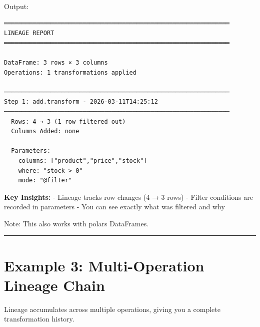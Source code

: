 \documentclass[
  letterpaper,
]{scrbook}
\begin{document}
Output:

\begin{verbatim}
═══════════════════════════════════════════════════════════════
LINEAGE REPORT
═══════════════════════════════════════════════════════════════

DataFrame: 3 rows × 3 columns
Operations: 1 transformations applied

───────────────────────────────────────────────────────────────
Step 1: add.transform - 2026-03-11T14:25:12
───────────────────────────────────────────────────────────────
  Rows: 4 → 3 (1 row filtered out)
  Columns Added: none
  
  Parameters:
    columns: ["product","price","stock"]
    where: "stock > 0"
    mode: "@filter"
\end{verbatim}

\textbf{Key Insights:} - Lineage tracks row changes (4 → 3 rows) -
Filter conditions are recorded in parameters - You can see exactly what
was filtered and why

Note: This also works with polars DataFrames.

\begin{center}\rule{0.5\linewidth}{0.5pt}\end{center}

\section{Example 3: Multi-Operation Lineage
Chain}\label{example-3-multi-operation-lineage-chain}

Lineage accumulates across multiple operations, giving you a complete
transformation history.
\end{document}
